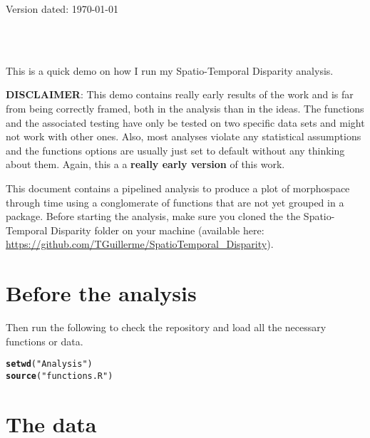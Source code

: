 \documentclass[a4paper,11pt]{article}\usepackage[]{graphicx}\usepackage[]{color}
\makeatletter
\newcommand{\hlstr}[1]{\textcolor[rgb]{0.192,0.494,0.8}{#1}}%
\newcommand{\hlstd}[1]{\textcolor[rgb]{0.345,0.345,0.345}{#1}}%
\newcommand{\hlkwd}[1]{\textcolor[rgb]{0.737,0.353,0.396}{\textbf{#1}}}%
\newenvironment{kframe}{%
 \def\at@end@of@kframe{}%
 \ifinner\ifhmode%
  \def\at@end@of@kframe{\end{minipage}}%
  \begin{minipage}{\columnwidth}%
 \fi\fi%
 \def\FrameCommand##1{\hskip\@totalleftmargin \hskip-\fboxsep
 \colorbox{shadecolor}{##1}\hskip-\fboxsep
     \hskip-\linewidth \hskip-\@totalleftmargin \hskip\columnwidth}%
 \MakeFramed {\advance\hsize-\width
   \@totalleftmargin\z@ \linewidth\hsize
   \@setminipage}}%
 {\par\unskip\endMakeFramed%
 \at@end@of@kframe}
\newenvironment{knitrout}{}{} %
\makeatother
\begin{document}
\begin{flushright}
Version dated: \today
\end{flushright}
\begin{center}

\\
\bigskip
\\

\end{center}
This is a quick demo on how I run my Spatio-Temporal Disparity analysis.

\textbf{DISCLAIMER}:
This demo contains really early results of the work and is far from being correctly framed, both in the analysis than in the ideas.
The functions and the associated testing have only be tested on two specific data sets and might not work with other ones.
Also, most analyses violate any statistical assumptions and the functions options are usually just set to default without any thinking about them.
Again, this a a \textbf{really early version} of this work.

This document contains a pipelined analysis to produce a plot of morphospace through time using a conglomerate of functions that are not yet grouped in a package.
Before starting the analysis, make sure you cloned the the Spatio-Temporal Disparity folder on your machine (available here: \url{https://github.com/TGuillerme/SpatioTemporal_Disparity}).

\section{Before the analysis}
Then run the following to check the repository and load all the necessary functions or data.

\begin{knitrout}
\color{fgcolor}\begin{kframe}
\begin{alltt}
\hlkwd{setwd}\hlstd{(}\hlstr{"Analysis"}\hlstd{)}
\hlkwd{source}\hlstd{(}\hlstr{"functions.R"}\hlstd{)}
\end{alltt}
\end{kframe}
\end{knitrout}

\section{The data} \label{data}
\end{document}
